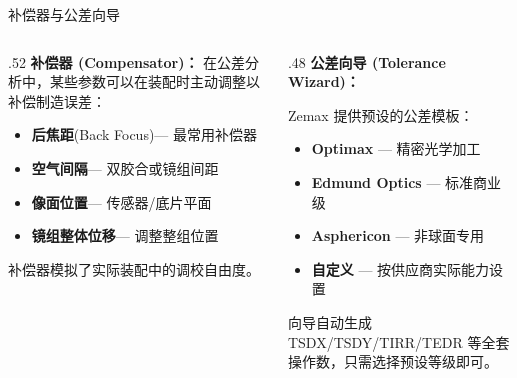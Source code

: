 \begin{frame}{补偿器与公差向导}
    \begin{columns}[T]
        \begin{column}{.52\textwidth}
            \textbf{补偿器 (Compensator)：}
            在公差分析中，某些参数可以在装配时\alert{主动调整}以补偿制造误差：

            \begin{itemize}
                \item \textbf{后焦距}(Back Focus)— 最常用补偿器
                \item \textbf{空气间隔}— 双胶合或镜组间距
                \item \textbf{像面位置}— 传感器/底片平面
                \item \textbf{镜组整体位移}— 调整整组位置
            \end{itemize}

            \bigbreak
            \alert{补偿器模拟了实际装配中的调校自由度。}
        \end{column}
        \hfill
        \begin{column}{.48\textwidth}
            \textbf{公差向导 (Tolerance Wizard)：}

            Zemax 提供预设的公差模板：
            \begin{itemize}
                \item \textbf{Optimax} — 精密光学加工
                \item \textbf{Edmund Optics} — 标准商业级
                \item \textbf{Asphericon} — 非球面专用
                \item \textbf{自定义} — 按供应商实际能力设置
            \end{itemize}

            \bigbreak
            向导自动生成 TSDX/TSDY/TIRR/TEDR 等全套操作数，只需选择预设等级即可。
        \end{column}
    \end{columns}
\end{frame}

